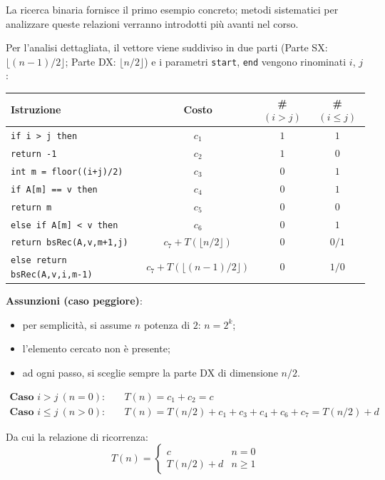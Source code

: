 \documentclass[12pt, a4paper]{article}
\begin{document}
La ricerca binaria fornisce il primo esempio concreto; metodi sistematici per analizzare queste relazioni verranno introdotti più avanti nel corso.

Per l'analisi dettagliata, il vettore viene suddiviso in due parti (Parte SX: $\lfloor (n-1)/2 \rfloor$; Parte DX: $\lfloor n/2 \rfloor$) e i parametri \texttt{start}, \texttt{end} vengono rinominati $i$, $j$:

\begin{center}
\small
\begin{tabular}{lccc}
\toprule
\textbf{Istruzione} & \textbf{Costo} & \textbf{\#$(i>j)$} & \textbf{\#$(i\le j)$} \\
\midrule
\texttt{if i > j then} & $c_1$ & $1$ & $1$ \\
\texttt{\quad return -1} & $c_2$ & $1$ & $0$ \\
\texttt{int m = floor((i+j)/2)} & $c_3$ & $0$ & $1$ \\
\texttt{if A[m] == v then} & $c_4$ & $0$ & $1$ \\
\texttt{\quad return m} & $c_5$ & $0$ & $0$ \\
\texttt{else if A[m] < v then} & $c_6$ & $0$ & $1$ \\
\texttt{\quad return bsRec(A,v,m+1,j)} & $c_7 + T(\lfloor n/2 \rfloor)$ & $0$ & $0/1$ \\
\texttt{else return bsRec(A,v,i,m-1)} & $c_7 + T(\lfloor (n-1)/2 \rfloor)$ & $0$ & $1/0$ \\
\bottomrule
\end{tabular}
\end{center}

\textbf{Assunzioni (caso peggiore)}:
\begin{itemize}
    \item per semplicità, si assume $n$ potenza di $2$: $n = 2^k$;
    \item l'elemento cercato non è presente;
    \item ad ogni passo, si sceglie sempre la parte DX di dimensione $n/2$.
\end{itemize}

\begin{align*}
\textbf{Caso } i > j\ (n=0): \quad & T(n) = c_1 + c_2 = c \\
\textbf{Caso } i \le j\ (n>0): \quad & T(n) = T(n/2) + c_1+c_3+c_4+c_6+c_7 = T(n/2)+d
\end{align*}

Da cui la relazione di ricorrenza:
$$T(n) = \begin{cases} c & n = 0 \\ T(n/2) + d & n \ge 1 \end{cases}$$
\end{document}
